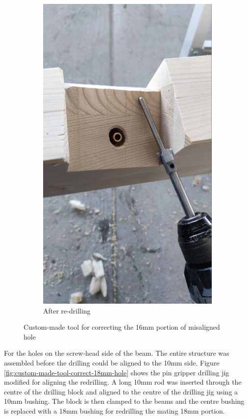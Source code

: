 \begin{figure}[!h]
\begin{subfigure}[b]{0.49\textwidth}
        \centering
        \includegraphics[width=\textwidth]{images/7b/img75.jpg}
        \caption{After re-drilling}
    \end{subfigure}
    \caption{Custom-made tool for correcting the 16mm portion of misaligned hole}
    \label{fig:custom-made-tool-correct-16mm-hole}
\end{figure}

For the holes on the screw-head side of the beam. The entire structure was assembled before the drilling could be aligned to the 10mm side. Figure \ref{fig:custom-made-tool-correct-18mm-hole} shows the pin gripper drilling jig  modified for aligning the redrilling. A long 10mm rod was inserted through the centre of the drilling block and aligned to the centre of the drilling jig using a 10mm bushing. The block is then clamped to the beams and the centre bushing is replaced with a 18mm bushing for redrilling the mating 18mm portion. 


